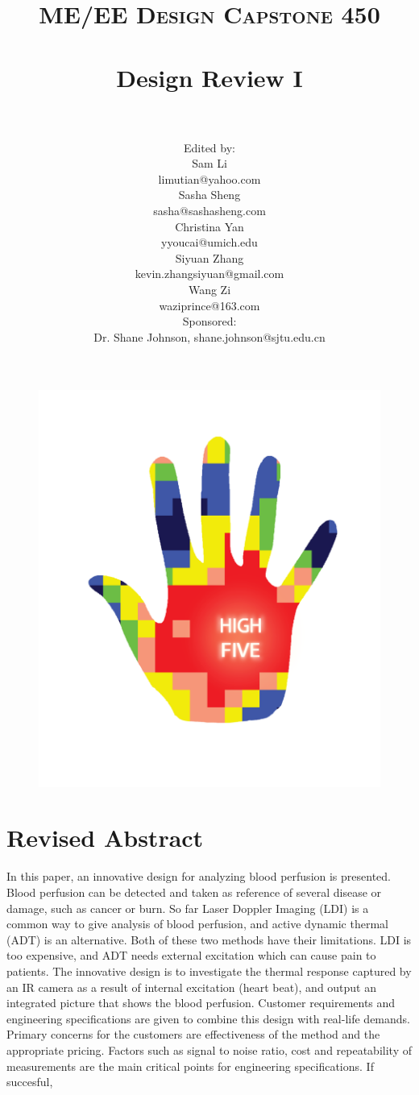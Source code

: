 \documentclass[paper=letter, fontsize=11pt]{scrartcl}
\title{
		\vspace{-1in} 	
		\usefont{OT1}{bch}{b}{n}
		\normalfont \normalsize \textsc{ME/EE Design Capstone 450} \\ [25pt]
		\horrule{0.5pt} \\[0.4cm]
		\huge Design Review I \\
		\horrule{2pt} \\[0.5cm]
}
\author{
        \normalfont 							
        \normalsize
        Edited by: \\
        Sam Li \\ limutian@yahoo.com \\[2pt]
        Sasha Sheng \\ sasha@sashasheng.com\\[2pt]
        Christina Yan \\ yyoucai@umich.edu\\[2pt]
        Siyuan Zhang\\ kevin.zhangsiyuan@gmail.com\\[2pt]
        Wang Zi \\ waziprince@163.com\\ [2pt]
         Sponsored: \\ Dr. Shane Johnson,  shane.johnson@sjtu.edu.cn\\ \vspace{0.5cm}
}
\numberwithin{equation}{section}		%
\numberwithin{figure}{section}			%
\numberwithin{table}{section}			%
\begin{document}
\maketitle
\begin{figure}[H]
    \centering
    \includegraphics[scale=0.7]{LOGO.png}
\end{figure}
\pagebreak
\tableofcontents
\pagebreak
	
\section{Revised Abstract}	
In this paper, an innovative design for analyzing blood perfusion is presented. Blood perfusion can be detected and
taken as reference of several disease or damage, such as cancer or burn. So far Laser Doppler Imaging (LDI) is a 
common way to give analysis of blood perfusion, and active dynamic thermal (ADT) is an alternative. Both of 
these two methods have their 
limitations. LDI is too expensive, and ADT needs external excitation which can cause pain to patients. The innovative design is to 
investigate the thermal response captured by an IR camera as a result of internal excitation (heart beat), and output an 
integrated picture that shows the blood perfusion. Customer requirements and engineering 
specifications are given to combine this design with real-life demands. Primary concerns for the customers are effectiveness
of the method and the appropriate pricing. Factors such as signal to noise ratio, cost and repeatability of measurements are the
main critical points for engineering specifications. If succesful, 
\end{document}
